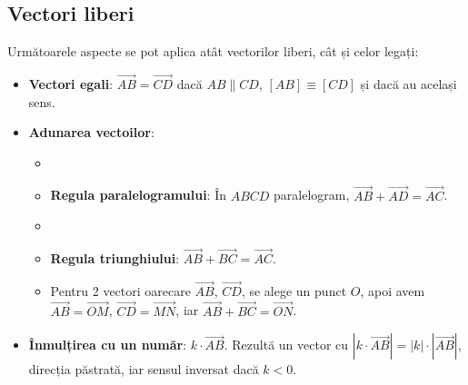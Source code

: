 \documentclass{article}
\begin{document}
\subsection*{Vectori liberi}
Următoarele aspecte se pot aplica atât vectorilor liberi, cât și celor legați:
\begin{itemize}
    \item \textbf{Vectori egali}: $\overrightarrow{AB} = \overrightarrow{CD}$ dacă $AB \parallel CD$, $[AB] \equiv [CD]$ și dacă au același sens.
    \item \textbf{Adunarea vectoilor}:
    \begin{itemize}
        \item[] 
        \item \textbf{Regula paralelogramului}: În $ABCD$ paralelogram, $\overrightarrow{AB}+\overrightarrow{AD}=\overrightarrow{AC}$.\item[] 
        \item \textbf{Regula triunghiului}: $\overrightarrow{AB}+\overrightarrow{BC}=\overrightarrow{AC}$.
        \item Pentru 2 vectori oarecare $\overrightarrow{AB}$, $\overrightarrow{CD}$, se alege un punct $O$, apoi avem $\overrightarrow{AB} = \overrightarrow{OM}$, $\overrightarrow{CD} = \overrightarrow{MN}$, iar $\overrightarrow{AB}+\overrightarrow{BC}=\overrightarrow{ON}$.
    \end{itemize}
    \item \textbf{Înmulțirea cu un număr}: $k\cdot \overrightarrow{AB}$. Rezultă un vector cu $|k\cdot \overrightarrow{AB}| = |k|\cdot|\overrightarrow{AB}|$, direcția păstrată, iar sensul inversat dacă $k<0$.

\end{itemize}
\end{document}
